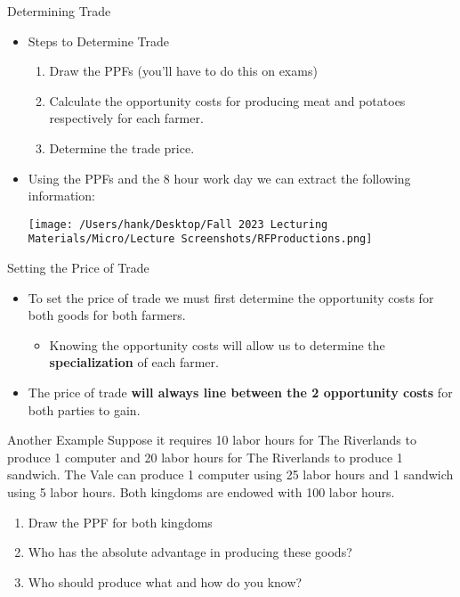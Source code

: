\documentclass{beamer}
\begin{document}
\begin{frame}{Determining Trade}
    \begin{itemize}
        \item Steps to Determine Trade
        \begin{enumerate}
            \item Draw the PPFs (you'll have to do this on exams)
            \item Calculate the opportunity costs for producing meat and potatoes respectively for each farmer.
            \item Determine the trade price.
        \end{enumerate}
        \item Using the PPFs and the 8 hour work day we can extract the following information:
            \begin{center}
                \texttt{[image: /Users/hank/Desktop/Fall 2023 Lecturing Materials/Micro/Lecture Screenshots/RFProductions.png]}
            \end{center}
    \end{itemize}
\end{frame}

\begin{frame}{Setting the Price of Trade}
    \begin{itemize}
        \item To set the price of trade we must first determine the opportunity costs for both goods for both farmers.
        \vspace{5mm} 
        \begin{itemize}
            \item Knowing the opportunity costs will allow us to determine the \textbf{specialization} of each farmer.
        \end{itemize}
        \vspace{5mm}
        \item The price of trade \textbf{will always line between the 2 opportunity costs} for both parties to gain.
    \end{itemize}
    
\end{frame}

\begin{frame}{Another Example}
    Suppose it requires 10 labor hours for The Riverlands to produce 1 computer and 20 labor hours for The Riverlands to produce 1 sandwich. The Vale can produce 1 computer using 25 labor hours and 1 sandwich using 5 labor hours. Both kingdoms are endowed with 100 labor hours. 
    \vspace{5mm}\begin{enumerate}
        \item Draw the PPF for both kingdoms
        \item Who has the absolute advantage in producing these goods?
        \item Who should produce what and how do you know?
    \end{enumerate}

\end{frame}
\end{document}
